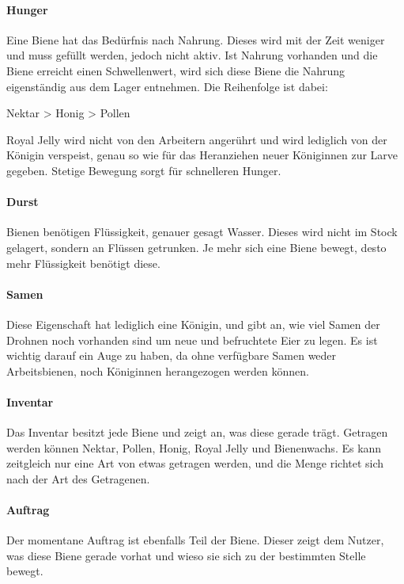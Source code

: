 \paragraph{Hunger} 
Eine Biene hat das Bedürfnis nach Nahrung. Dieses wird mit der Zeit weniger und muss gefüllt werden, jedoch nicht aktiv. Ist Nahrung vorhanden und die Biene erreicht einen Schwellenwert, wird sich diese Biene die Nahrung eigenständig aus dem Lager entnehmen. Die Reihenfolge ist dabei:

\begin{center}
    Nektar > Honig > Pollen
\end{center}

Royal Jelly wird nicht von den Arbeitern angerührt und wird lediglich von der Königin verspeist, genau so wie für das Heranziehen neuer Königinnen zur Larve gegeben. Stetige Bewegung sorgt für schnelleren Hunger.

\paragraph{Durst} 
Bienen benötigen Flüssigkeit, genauer gesagt Wasser. Dieses wird nicht im Stock gelagert, sondern an Flüssen getrunken. Je mehr sich eine Biene bewegt, desto mehr Flüssigkeit benötigt diese.

\paragraph{Samen} 
Diese Eigenschaft hat lediglich eine Königin, und gibt an, wie viel Samen der Drohnen noch vorhanden sind um neue und befruchtete Eier zu legen. Es ist wichtig darauf ein Auge zu haben, da ohne verfügbare Samen weder Arbeitsbienen, noch Königinnen herangezogen werden können.

\paragraph{Inventar} 
Das Inventar besitzt jede Biene und zeigt an, was diese gerade trägt. Getragen werden können Nektar, Pollen, Honig, Royal Jelly und Bienenwachs. Es kann zeitgleich nur eine Art von etwas getragen werden, und die Menge richtet sich nach der Art des Getragenen.

\paragraph{Auftrag} 
Der momentane Auftrag ist ebenfalls Teil der Biene. Dieser zeigt dem Nutzer, was diese Biene gerade vorhat und wieso sie sich zu der bestimmten Stelle bewegt.

